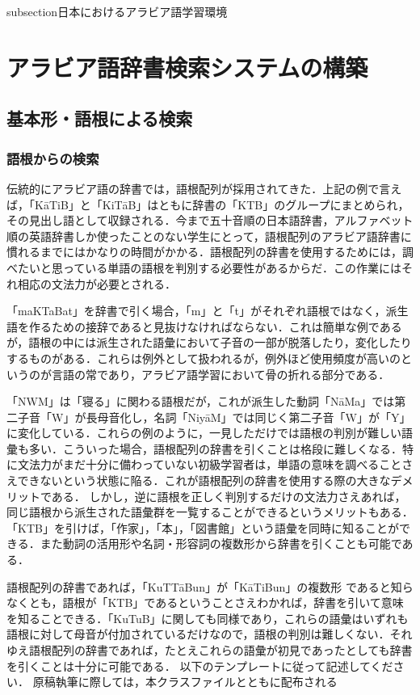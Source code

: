 \documentclass[technicalreport]{ieicej}
\begin{document}
subsection{日本におけるアラビア語学習環境}

\section{アラビア語辞書検索システムの構築}
\subsection{基本形・語根による検索}
\subsubsection{語根からの検索}
伝統的にアラビア語の辞書では，語根配列が採用されてきた．上記の例で言えば，「KāTiB」と「KiTāB」はともに辞書の「KTB」のグループにまとめられ，その見出し語として収録される．今まで五十音順の日本語辞書，アルファベット順の英語辞書しか使ったことのない学生にとって，語根配列のアラビア語辞書に慣れるまでにはかなりの時間がかかる．語根配列の辞書を使用するためには，調べたいと思っている単語の語根を判別する必要性があるからだ．この作業にはそれ相応の文法力が必要とされる．

「maKTaBat」を辞書で引く場合，「m」と「t」がそれぞれ語根ではなく，派生語を作るための接辞であると見抜けなければならない．これは簡単な例であるが，語根の中には派生された語彙において子音の一部が脱落したり，変化したりするものがある．これらは例外として扱われるが，例外ほど使用頻度が高いのというのが言語の常であり，アラビア語学習において骨の折れる部分である．

「NWM」は「寝る」に関わる語根だが，これが派生した動詞「NāMa」では第二子音「W」が長母音化し，名詞「NiyāM」では同じく第二子音「W」が「Y」に変化している．これらの例のように，一見しただけでは語根の判別が難しい語彙も多い．こういった場合，語根配列の辞書を引くことは格段に難しくなる．特に文法力がまだ十分に備わっていない初級学習者は，単語の意味を調べることさえできないという状態に陥る．これが語根配列の辞書を使用する際の大きなデメリットである．
しかし，逆に語根を正しく判別するだけの文法力さえあれば，同じ語根から派生された語彙群を一覧することができるというメリットもある． 「KTB」を引けば，「作家」，「本」，「図書館」という語彙を同時に知ることができる．また動詞の活用形や名詞・形容詞の複数形から辞書を引くことも可能である．

語根配列の辞書であれば，「KuTTāBun」が「KāTiBun」の複数形 であると知らなくとも，語根が「KTB」であるということさえわかれば，辞書を引いて意味を知ることできる．「KuTuB」に関しても同様であり，これらの語彙はいずれも語根に対して母音が付加されているだけなので，語根の判別は難しくない．それゆえ語根配列の辞書であれば，たとえこれらの語彙が初見であったとしても辞書を引くことは十分に可能である．
以下のテンプレートに従って記述してください．
原稿執筆に際しては，本クラスファイルとともに配布される
\end{document}
